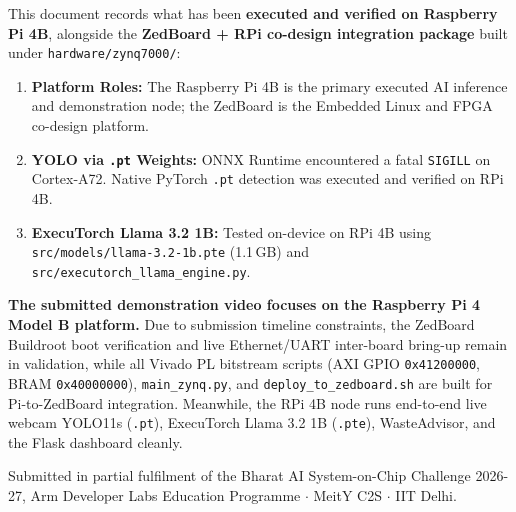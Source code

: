 \documentclass[12pt,a4paper]{article}
\begin{document}
\begin{titlepage}
\vspace{0.35cm}

\begin{tcolorbox}[
  enhanced,colback=ecosortgreen!7,colframe=ecosortgreen!70!black,
  fonttitle=\bfseries\small,title={Document Purpose \& Executed Verification Scope},
  top=4pt,bottom=4pt,left=8pt,right=8pt,boxrule=0.8pt]
\footnotesize
This document records what has been \textbf{executed and verified on Raspberry Pi 4B}, alongside
the \textbf{ZedBoard + RPi co-design integration package} built under \texttt{hardware/zynq7000/}:
\begin{enumerate}[noitemsep,leftmargin=*]
  \item \textbf{Platform Roles:} The Raspberry Pi 4B is the primary executed AI inference and
  demonstration node; the ZedBoard is the Embedded Linux and FPGA co-design platform.
  \item \textbf{YOLO via \texttt{.pt} Weights:} ONNX Runtime encountered a fatal \texttt{SIGILL}
  on Cortex-A72. Native PyTorch \texttt{.pt} detection was executed and verified on RPi 4B.
  \item \textbf{ExecuTorch Llama 3.2 1B:} Tested on-device on RPi 4B using
  \texttt{src/models/llama-3.2-1b.pte} (1.1\,GB) and \texttt{src/executorch\_llama\_engine.py}.
\end{enumerate}
\end{tcolorbox}

\vspace{0.25cm}

\begin{tcolorbox}[enhanced,colback=ecosortblue!5,colframe=ecosortblue,coltitle=white,
  fonttitle=\bfseries\small,title={Demonstration Video Scope Justification},
  top=4pt,bottom=4pt,left=8pt,right=8pt,boxrule=0.8pt]
\footnotesize
\textbf{The submitted demonstration video focuses on the Raspberry Pi 4 Model B platform.}
Due to submission timeline constraints, the ZedBoard Buildroot boot verification and live
Ethernet/UART inter-board bring-up remain in validation, while all Vivado PL bitstream scripts
(AXI GPIO \texttt{0x41200000}, BRAM \texttt{0x40000000}), \texttt{main\_zynq.py}, and
\texttt{deploy\_to\_zedboard.sh} are built for Pi-to-ZedBoard integration. Meanwhile, the RPi 4B
node runs end-to-end live webcam YOLO11s (\texttt{.pt}), ExecuTorch Llama 3.2 1B (\texttt{.pte}),
WasteAdvisor, and the Flask dashboard cleanly.
\end{tcolorbox}

\vfill
{\small\color{ecosortgray}
  Submitted in partial fulfilment of the Bharat AI System-on-Chip Challenge 2026-27,
  Arm Developer Labs Education Programme $\cdot$ MeitY C2S $\cdot$ IIT Delhi.
}
\end{titlepage}
\end{document}
